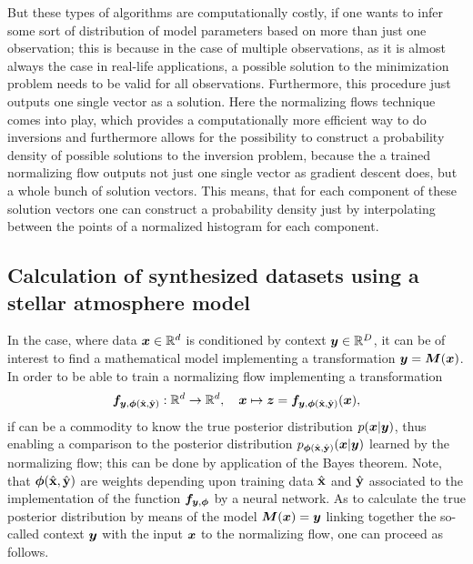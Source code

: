 \documentclass[a4paper,12pt]{report}
\begin{document}
But these types of algorithms are computationally costly, if one wants to infer some sort of distribution of model parameters based on more than just one observation; this is because in the case of multiple observations, as it is almost always the case in real-life applications, a possible solution to the minimization problem needs to be valid for all observations. Furthermore, this procedure just outputs one single vector as a solution. Here the normalizing flows technique comes into play, which provides a computationally more efficient way to do inversions and furthermore allows for the possibility to construct a probability density of possible solutions to the inversion problem, because the a trained normalizing flow outputs not just one single vector as gradient descent does, but a whole bunch of solution vectors. This means, that for each component of these solution vectors one can construct a probability density just by interpolating between the points of a normalized histogram for each component.

\subsection{Calculation of synthesized datasets using a stellar atmosphere model}\label{sec:calcsyntheticdatasets}
In the case, where data $\bm{x} \in \mathbb{R}^d$ is conditioned by context $\bm{y} \in \mathbb{R}^D$, it can be of interest to find a mathematical model implementing a transformation $\bm{y} = \bm{M}(\bm{x})$. In order to be able to train a normalizing flow implementing a transformation \begin{gather}
\bm{f}_{\bm{y},\bm{\phi}(\hat{\boldsymbol{\mathbf{x}}},\hat{\boldsymbol{\mathbf{y}}})}: \mathbb{R}^d\rightarrow \mathbb{R}^d, \quad \bm{x}\mapsto \bm{z} =  \bm{f}_{\bm{y},\bm{\phi}(\hat{\boldsymbol{\mathbf{x}}},\hat{\boldsymbol{\mathbf{y}}})}(\bm{x}),
\end{gather} if can be a commodity to know the true posterior distribution $p(\bm{x}|\bm{y})$, thus enabling a comparison to the posterior distribution $p_{\bm{\phi}(\hat{\boldsymbol{\mathbf{x}}},\hat{\boldsymbol{\mathbf{y}}})}(\bm{x}|\bm{y})$ learned by the normalizing flow; this can be done by application of the Bayes theorem. Note, that $\bm{\phi}(\hat{\boldsymbol{\mathbf{x}}},\hat{\boldsymbol{\mathbf{y}}})$ are weights depending upon training data $\hat{\boldsymbol{\mathbf{x}}}$ and $\hat{\boldsymbol{\mathbf{y}}}$ associated to the implementation of the function $\bm{f}_{\bm{y},\bm{\phi}}$ by a neural network. As to calculate the true posterior distribution by means of the model $\bm{M}(\bm{x}) = \bm{y}$ linking together the so-called context $\bm{y}$ with the input $\bm{x}$ to the normalizing flow, one can proceed as follows.
\end{document}
